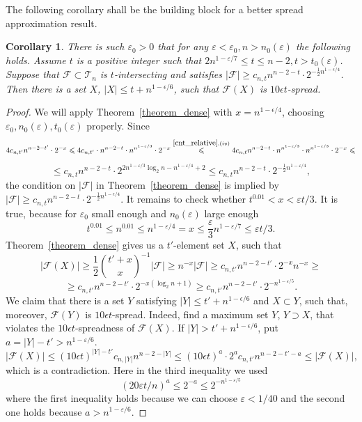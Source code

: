 \documentclass[11pt,letterpaper]{amsart}
\newcommand{\eps}{\varepsilon}
\renewcommand{\le}{\leqslant}
\renewcommand{\ge}{\geqslant}
\newcommand{\ff}{\mathcal{F}}
\newcommand{\T}{\mathcal{T}}
\newtheorem{corollary}[theorem]{Corollary}
\begin{document}
The following corollary shall be the building block for a better spread approximation result.

\begin{corollary}\label{cor_dense}
There is such $\eps_0 > 0$ that for any $\eps < \eps_0, n > n_0(\eps)$ the following holds. Assume $t$ is a positive integer such that $2n^{1-\eps/7} \le t \le n-2, t > t_0(\eps)$.
Suppose that $\ff\subset \T_n$ is $t$-intersecting and satisfies $|\ff|\ge c_{n, t}n^{n-2-t} \cdot 2^{-\frac 12 n^{1-\epsilon/4}}$. Then there is a set $X$, $|X|\le t+n^{1-\epsilon/6}$, such that $\ff(X)$ is $10\epsilon t$-spread.
\end{corollary}

\begin{proof}
We will apply Theorem~\ref{theorem_dense} with $x = n^{1-\epsilon/4}$, choosing $\eps_0, n_0(\eps), t_0(\eps)$ properly. Since $$4c_{n, t'}n^{n - 2 - t'}\cdot 2^{-x} \le 4c_{n, t'}\cdot n^{n-2-t}\cdot n^{n^{1 - \eps/3}}\cdot2^{-x}  \overset{\ref{cnt_relative}, (iv)}{\le} 4c_{n, t}n^{n-2-t}\cdot n^{n^{1 - \eps/3}}\cdot n^{n^{1 - \eps/3}}\cdot2^{-x} \le$$ $$\le c_{n, t}n^{n-2-t}\cdot2^{2n^{1-\eps/3}\log_2n - n^{1 - \eps/4} + 2} \le c_{n, t}n^{n-2-t}\cdot 2^{-\frac12n^{1 - \eps/4}},$$ the condition on $|\ff|$ in Theorem~\ref{theorem_dense} is implied by $|\ff|\ge c_{n, t}n^{n-2-t}\cdot 2^{-\frac 12 n^{1-\epsilon/4}}$. It remains to check whether $t^{0.01} < x < \eps t/3$. It is true, because for $\eps_0$ small enough and $n_0(\eps)$ large enough$$t^{0.01} \le n^{0.01} \le n^{1- \eps/4} = x \le \frac{\eps}3n^{1 - \eps/7} \le \eps t/3.$$ Theorem~\ref{theorem_dense} gives us a $t'$-element set $X$, such that
$$|\ff(X)|\ge \frac 12 {t'+x\choose x}^{-1}|\ff|\ge n^{-x}|\ff|\ge c_{n, t'}n^{n-2-t'}\cdot 2^{-x}n^{-x} \ge$$$$\ge c_{n, t'}n^{n-2-t'}\cdot 2^{-x(\log_2n +1)} \ge c_{n, t'}n^{n-2-t'}\cdot 2^{-n^{1 - \eps/5}}.$$
We claim that there is a set $Y$ satisfying $|Y|\le t'+n^{1-\epsilon/6}$ and $X\subset Y$, such that, moreover, $\ff(Y)$ is $10\epsilon t$-spread. Indeed, find a maximum set $Y$, $Y\supset X$, that violates the $10\epsilon t$-spreadness of $\ff(X)$. If $|Y|> t'+n^{1-\epsilon/6}$, put $a = |Y| - t' > n^{1 - \eps/6}$.
$$|\ff(X)|\le (10\epsilon t)^{|Y|-t'}c_{n, |Y|}n^{n-2-|Y|} \le (10\epsilon t)^a\cdot 2^ac_{n, t'}n^{n-2-t'-a} \le  |\ff(X)|,$$
which is a contradiction. Here in the third inequality we used $$(20\eps t/n)^a \le 2^{-a}\le 2^{-n^{1-\eps/5}}$$ where the first inequality holds because we can choose $\eps < 1/40$ and the second one holds because $a > n^{1 - \eps/6}$.
\end{proof}
\end{document}
